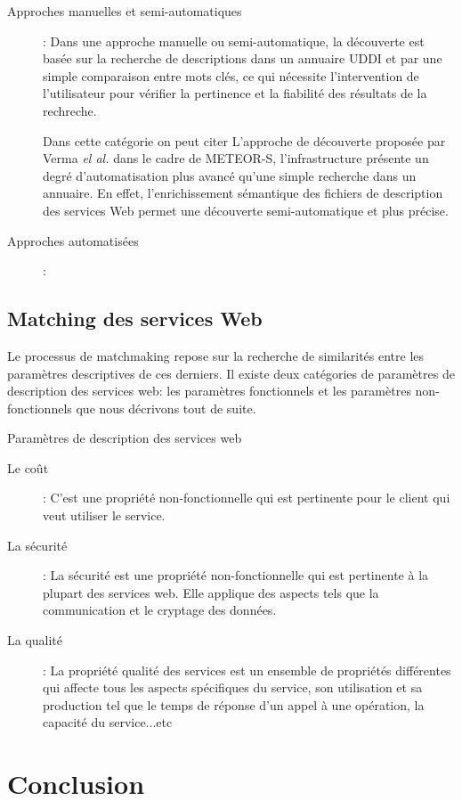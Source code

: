   \renewcommand{\descriptionlabel}[1]{\hspace{0cm}\textbullet~\textsf{#1}}
  \begin{description}
  \item [Approches manuelles et semi-automatiques]: Dans une approche
    manuelle ou semi-automatique, la découverte est basée sur la
    recherche de descriptions dans un annuaire \textsc{UDDI} et par
    une simple comparaison entre mots clés, ce qui nécessite
    l'intervention de l'utilisateur pour vérifier la pertinence et la
    fiabilité des résultats de la rechreche.

    Dans cette catégorie on peut citer L'approche de découverte
    proposée par Verma \textit{el al.} \cite{verma2005meteor} dans le
    cadre de \textsc{METEOR-S}, l'infrastructure présente un degré
    d'automatisation plus avancé qu'une simple recherche dans un
    annuaire. En effet, l'enrichissement sémantique des fichiers de
    description des services Web permet une découverte
    semi-automatique et plus précise.

  \item [Approches automatisées ]:
  \end{description}

  \newpage

  \subsection{Matching des services Web}
  \label{sec:ws-matching} Le processus de matchmaking repose sur la
  recherche de similarités entre les paramètres descriptives de ces
  derniers. Il existe deux catégories de paramètres de description des
  services web: les paramètres fonctionnels et les paramètres
  non-fonctionnels que nous décrivons tout de suite.

  Paramètres de description des services web

  \begin{description}
  \item [Le coût]: C’est une propriété non-fonctionnelle qui est
    pertinente pour le client qui veut utiliser le service.

  \item [La sécurité]: La sécurité est une propriété
    non-fonctionnelle qui est pertinente à la plupart des services
    web. Elle applique des aspects tels que la communication et le
    cryptage des données.

  \item [La qualité]: La propriété qualité des services est un
    ensemble de propriétés différentes qui affecte tous les aspects
    spécifiques du service, son utilisation et sa production tel que
    le temps de réponse d'un appel à une opération, la capacité du
    service...etc
  \end{description}
\newpage
\section{Conclusion}

